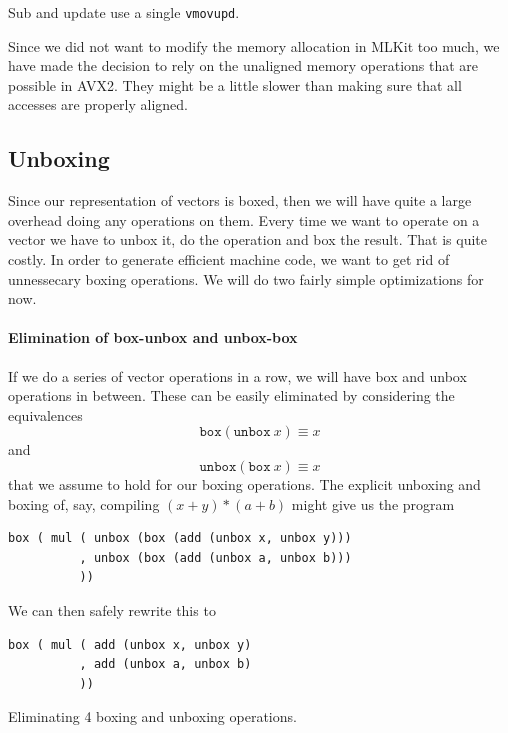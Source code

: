 \documentclass{article}
\begin{document}
Sub and update use a single \verb!vmovupd!.

Since we did not want to modify the memory allocation in MLKit too much, we have made the decision to rely on the unaligned memory operations that are possible in AVX2. They might be a little slower than making sure that all accesses are properly aligned.

\subsection{Unboxing}

Since our representation of vectors is boxed, then we will have quite a large overhead doing any operations on them. Every time we want to operate on a vector we have to unbox it, do the operation and box the result. That is quite costly. In order to generate efficient machine code, we want to get rid of unnessecary boxing operations. We will do two fairly simple optimizations for now.

\paragraph{Elimination of box-unbox and unbox-box}
If we do a series of vector operations in a row, we will have box and unbox operations in between. These can be easily eliminated by considering the equivalences
\[
    \mathtt{box} (\mathtt{unbox}\ x) \equiv x
\]
and
\[
    \mathtt{unbox} (\mathtt{box}\ x) \equiv x
\]
that we assume to hold for our boxing operations. The explicit unboxing and boxing of, say, compiling $(x + y) * (a + b)$ might give us the program 
\begin{lstlisting}
box ( mul ( unbox (box (add (unbox x, unbox y)))
          , unbox (box (add (unbox a, unbox b)))
          ))
\end{lstlisting}
We can then safely rewrite this to
\begin{lstlisting}
box ( mul ( add (unbox x, unbox y)
          , add (unbox a, unbox b)
          ))
\end{lstlisting}
Eliminating 4 boxing and unboxing operations.
\end{document}
